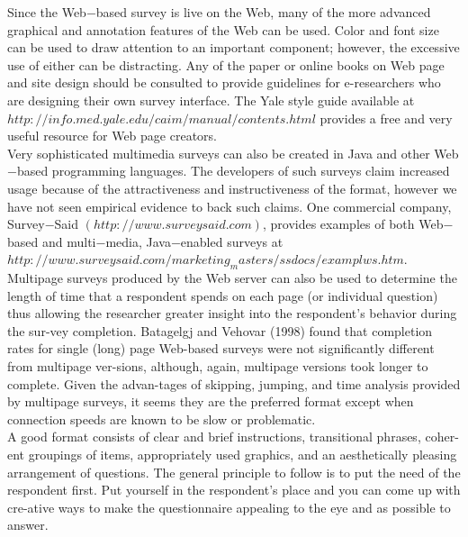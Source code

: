 \documentclass{article}
\begin{document}
\vspace*{0.5cm}
\hspace*{0.5cm} Since the Web$-$based survey is live on the Web, many of the more advanced graphical and annotation features of the Web can be used. Color and font size can be used to draw attention to an important component; however, the excessive use of either can be distracting. Any of the paper or online books on Web page and site design should be consulted to provide guidelines for e-researchers who are designing their own survey interface. The Yale style guide available at $http://info.med.yale.edu/caim/manual/contents.html$ provides a free and very useful resource for Web page creators.\\
\hspace*{0.5cm} Very sophisticated multimedia surveys can also be created in Java and other Web$-$based programming languages. The developers of such surveys claim increased usage because of the attractiveness and instructiveness of the format, however we have not seen empirical evidence to back such claims. One commercial company, Survey$-$Said $(http://www.surveysaid.com)$, provides examples of both Web$-$based and multi$-$media, Java$-$enabled surveys at $http://www.surveysaid.com/marketing_masters/ssdocs/examplws.htm$.\\

 \hspace*{0.5cm} Multipage surveys produced by the Web server can also be used to determine the length of time that a respondent spends on each page (or individual question) thus allowing the researcher greater insight into the respondent's behavior during the sur-vey completion. Batagelgj and Vehovar (1998) found that completion rates for single (long) page Web-based surveys were not significantly different from multipage ver-sions, although, again, multipage versions took longer to complete. Given the advan-tages of skipping, jumping, and time analysis provided by multipage surveys, it seems they are the preferred format except when connection speeds are known to be slow or problematic.\\
\hspace*{0.5cm} A good format consists of clear and brief instructions, transitional phrases, coher-ent groupings of items, appropriately used graphics, and an aesthetically pleasing arrangement of questions. The general principle to follow is to put the need of the respondent first. Put yourself in the respondent's place and you can come up with cre-ative ways to make the questionnaire appealing to the eye and as possible to answer.\\
\end{document}
